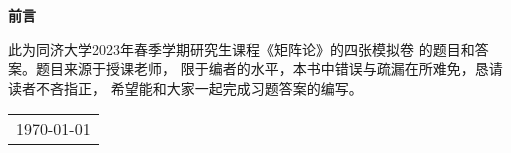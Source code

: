 \def\myDateForeword{\today}

\newpage
\thispagestyle{empty}
\begin{center}
    \Huge\textbf{前言}
\end{center}
\indent 此为同济大学2023年春季学期研究生课程《矩阵论》的四张模拟卷
的题目和答案。题目来源于授课老师，
限于编者的水平，本书中错误与疏漏在所难免，恳请读者不吝指正，
希望能和大家一起完成习题答案的编写。
\begin{flushright}
    \begin{tabular}{c}
        \myDateForeword
    \end{tabular}
\end{flushright}

\newpage
\pagestyle{plain}
\setcounter{page}{1}
\tableofcontents

\newpage
{}
\setcounter{chapter}{0}
\setcounter{page}{1}

\pagestyle{fancy}
\fancyfoot[C]{\thepage}
\renewcommand{\headrulewidth}{0.4pt}
\renewcommand{\footrulewidth}{0pt}
